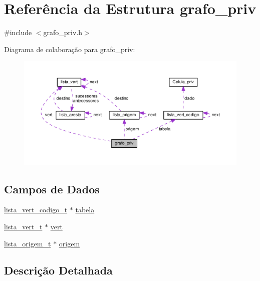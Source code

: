 \hypertarget{structgrafo__priv}{}\section{Referência da Estrutura grafo\+\_\+priv}
\label{structgrafo__priv}


{\ttfamily \#include $<$grafo\+\_\+priv.\+h$>$}



Diagrama de colaboração para grafo\+\_\+priv\+:
\nopagebreak
\begin{figure}[H]
\begin{center}
\leavevmode
\includegraphics[width=350pt]{structgrafo__priv__coll__graph}
\end{center}
\end{figure}
\subsection*{Campos de Dados}
\begin{DoxyCompactItemize}
\item 
\hyperlink{grafo__priv_8h_ae17c76eddcd8bd44e7d91faf7c00e2e5}{lista\+\_\+vert\+\_\+codigo\+\_\+t} $\ast$ \hyperlink{structgrafo__priv_a7aaee4699517501a8ca504043ef78ddb}{tabela}
\item 
\hyperlink{grafo__priv_8h_aecb68281fecb412bf6427dd6a07d5077}{lista\+\_\+vert\+\_\+t} $\ast$ \hyperlink{structgrafo__priv_a6f7e609364c2e69e02c56860b1a2c3ad}{vert}
\item 
\hyperlink{grafo__priv_8h_a91c8b187403e9724a757c92c941ab631}{lista\+\_\+origem\+\_\+t} $\ast$ \hyperlink{structgrafo__priv_a49b9f7cfbed0b2dff3c5b373d79385db}{origem}
\end{DoxyCompactItemize}


\subsection{Descrição Detalhada}


